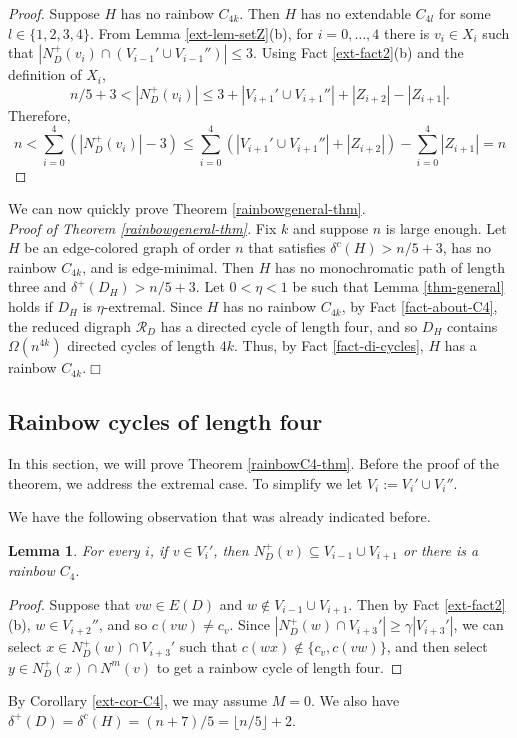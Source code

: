 \documentclass{article}
\newtheorem{lemma}[theorem]{Lemma}
\begin{document}
\begin{proof}
Suppose $H$ has no rainbow $C_{4k}$. Then $H$ has no extendable $C_{4l}$ for some $l\in \{1, 2, 3, 4\}$. From Lemma \ref{ext-lem-setZ}(b), for $i=0,\dots, 4$ there is $v_i\in X_i$ such that $|N^+_D(v_i)\cap (V_{i-1}'\cup V_{i-1}'')|\leq 3.$ Using Fact \ref{ext-fact2}(b) and the definition of $X_i$, $$n/5 +3<|N^+_D(v_i)|\leq 3+ |V_{i+1}'\cup V_{i+1}''|+|Z_{i+2}|-|Z_{i+1}|.$$ Therefore,
$$ n<\sum_{i=0}^4(|N^+_D(v_i)|-3)\leq \sum_{i=0}^4(|V_{i+1}'\cup V_{i+1}''|+|Z_{i+2}|)-\sum_{i=0}^4|Z_{i+1}|=n$$
\end{proof}
We can now quickly prove Theorem \ref{rainbowgeneral-thm}.\\
{\it Proof of Theorem \ref{rainbowgeneral-thm}.}
Fix $k$ and suppose $n$ is large enough. Let $H$ be an edge-colored graph of order $n$ that satisfies $\delta^c(H)> n/{5}+3$, has no rainbow $C_{4k}$, and is edge-minimal. Then $H$ has no monochromatic path of length three and $\delta^+(D_H)> n/{5}+3$.
Let $0<\eta< 1$ be such that Lemma \ref{thm-general} holds if $D_H$ is $\eta$-extremal. Since $H$ has no rainbow $C_{4k}$, by  Fact \ref{fact-about-C4}, the reduced digraph $\mathcal{R}_D$ has a directed cycle of length four, and so $D_H$ contains $\Omega(n^{4k})$ directed cycles of length $4k$. Thus, by Fact \ref{fact-di-cycles}, $H$ has a rainbow $C_{4k}$.$\Box$
 \subsection{Rainbow cycles of length four}\label{ext-subsec-3}

In this section, we will prove Theorem \ref{rainbowC4-thm}. Before the proof of the theorem, we address the extremal case. To simplify we let $V_i:=V_i'\cup V_i''$.


We have the following observation that was already indicated before.
\begin{lemma}For every $i$, if $v\in V_{i}'$, then $N_D^+(v)\subseteq V_{i-1}\cup V_{i+1}$ or there is a rainbow $C_4.$ \end{lemma}
\begin{proof}
Suppose that $vw\in E(D)$ and $w \notin V_{i-1}\cup V_{i+1}$. Then by Fact \ref{ext-fact2}(b), $w\in V_{i+2}''$, and so $c(vw)\neq c_v$. Since $|N^+_D(w)\cap V_{i+3}'|\geq \gamma |V_{i+3}'|$, we can select $x\in N^+_D(w)\cap V_{i+3}'$ such that $c(wx)\notin \{c_v, c(vw)\}$, and then select $y\in N^+_D(x)\cap N^m(v)$ to get a rainbow cycle of length four.
\end{proof}
By Corollary \ref{ext-cor-C4}, we may assume $M=0$. We also have $\delta^+(D)=\delta^c(H)= (n+7)/5= \lfloor n/5\rfloor+2$. 
\end{document}
